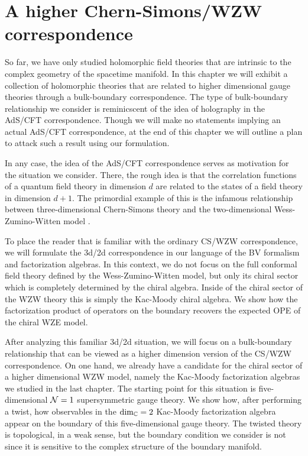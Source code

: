 \documentclass[10pt]{amsart}
\begin{document}
\section{A higher Chern-Simons/WZW correspondence}

So far, we have only studied holomorphic field theories that are intrinsic to the complex geometry of the spacetime manifold.
In this chapter we will exhibit a collection of holomorphic theories that are related to higher dimensional gauge theories through a bulk-boundary correspondence.
The type of bulk-boundary relationship we consider is reminicscent of the idea of holography in the AdS/CFT correspondence.
Though we will make no statements implying an actual AdS/CFT correspondence, at the end of this chapter we will outline a plan to attack such a result using our formulation.

In any case, the idea of the AdS/CFT correspondence serves as motivation for the situation we consider. 
There, the rough idea is that the correlation functions of a quantum field theory in dimension $d$ are related to the states of a field theory in dimension $d+1$.
The primordial example of this is the infamous relationship between three-dimensional Chern-Simons theory and the two-dimensional Wess-Zumino-Witten model \cite{WittenJones}.

To place the reader that is familiar with the ordinary CS/WZW correspondence, we will formulate the 3d/2d correspondence in our language of the BV formalism and factorization algebras.
In this context, we do not focus on the full conformal field theory defined by the Wess-Zumino-Witten model, but only its chiral sector which is completely determined by the chiral algebra. 
Inside of the chiral sector of the WZW theory this is simply the Kac-Moody chiral algebra.
We show how the factorization product of operators on the boundary recovers the expected OPE of the chiral WZE model.

After analyzing this familiar 3d/2d situation, we will focus on a bulk-boundary relationship that can be viewed as a higher dimension version of the CS/WZW correspondence. 
On one hand, we already have a candidate for the chiral sector of a higher dimensional WZW model, namely the Kac-Moody factorization algebras we studied in the last chapter.
The starting point for this situation is five-dimensional $\mathcal N = 1$ supersymmetric gauge theory. 
We show how, after performing a twist, how observables in the $\dim_\mathbb C = 2$ Kac-Moody factorization algebra appear on the boundary of this five-dimensional gauge theory. 
The twisted theory is topological, in a weak sense, but the boundary condition we consider is not since it is sensitive to the complex structure of the boundary manifold.
\end{document}
